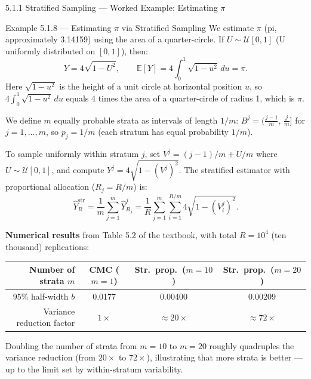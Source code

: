 \documentclass[aspectratio=169,10pt]{beamer}
\begin{document}
\begin{frame}[allowframebreaks]{5.1.1 Stratified Sampling --- Worked Example: Estimating $\pi$}

\begin{exampleblock}{Example 5.1.8 --- Estimating $\pi$ via Stratified Sampling}
  We estimate $\pi$ (pi, approximately 3.14159) using the area of a
  quarter-circle.  If $U \sim \mathcal{U}[0,1]$ (U uniformly distributed on $[0,1]$),
  then:
  \[
    Y = 4\sqrt{1-U^2}, \qquad
    \mathbb{E}[Y] = 4\int_0^1\!\sqrt{1-u^2}\,du = \pi.
  \]
  Here $\sqrt{1-u^2}$ is the height of a unit circle at horizontal position $u$,
  so $4\int_0^1\sqrt{1-u^2}\,du$ equals 4 times the area of a quarter-circle of
  radius 1, which is $\pi$.

  We define $m$ equally probable strata as intervals of length $1/m$:
  $B^j = \bigl(\tfrac{j-1}{m},\, \tfrac{j}{m}\bigr]$ for $j = 1, \ldots, m$,
  so $p_j = 1/m$ (each stratum has equal probability $1/m$).

  To sample uniformly within stratum $j$, set $V^j = (j-1)/m + U/m$
  where $U \sim \mathcal{U}[0,1]$, and compute $Y^j = 4\sqrt{1-(V^j)^2}$.
  The stratified estimator with proportional allocation ($R_j = R/m$) is:
  \[
    \hat{Y}_R^{\mathrm{str}} = \frac{1}{m}\sum_{j=1}^m \hat{Y}_{R_j}^j
    = \frac{1}{R}\sum_{j=1}^m \sum_{i=1}^{R/m} 4\sqrt{1-(V_i^j)^2}.
  \]
\end{exampleblock}

\framebreak

\textbf{Numerical results} from Table 5.2 of the textbook, with total
$R = 10^4$ (ten thousand) replications:

\begin{center}\small
  \begin{tabular}{rccc}
    \toprule
    Number of strata $m$ & CMC ($m=1$) & Str.\ prop.\ ($m=10$) & Str.\ prop.\ ($m=20$) \\
    \midrule
    95\% half-width $b$ & 0.0177 & 0.00400 & 0.00209 \\
    Variance reduction factor & $1\times$ & $\approx 20\times$ & $\approx 72\times$ \\
    \bottomrule
  \end{tabular}
\end{center}

\medskip
Doubling the number of strata from $m=10$ to $m=20$ roughly quadruples the
variance reduction (from $20\times$ to $72\times$), illustrating that more strata
is better --- up to the limit set by within-stratum variability.


\end{frame}
\end{document}

